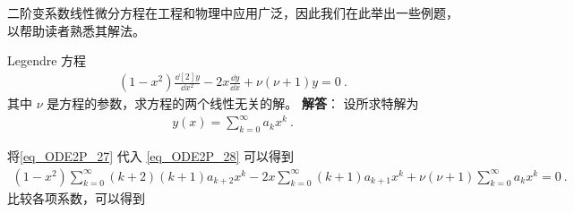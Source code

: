 二阶变系数线性微分方程在工程和物理中应用广泛，因此我们在此举出一些例题，以帮助读者熟悉其解法。

\begin{example}{Legendre 方程}
\begin{equation}\label{eq_ODE2P_28}
\begin{aligned}
    (1-x^2)\frac{\dd[2]{y}}{\dd x^2}-2x\frac{\dd y}{\dd x}+\nu(\nu+1)y=0~.
\end{aligned}
\end{equation}
其中 $\nu$ 是方程的参数，求方程的两个线性无关的解。
\textbf{解答}：
设所求特解为
\begin{equation}\label{eq_ODE2P_27}
\begin{aligned}
y(x) = \sum_{k=0}^\infty a_k x^k~.
\end{aligned}
\end{equation}

将\autoref{eq_ODE2P_27}  代入 \autoref{eq_ODE2P_28} 可以得到
\begin{equation}
\begin{aligned}
(1-x^2)\sum_{k=0}^{\infty}(k+2)(k+1)a_{k+2}x^k
-2x\sum_{k=0}^\infty (k+1)a_{k+1}x^k+\nu(\nu+1) \sum_{k=0}^\infty a_k x^k=0~.
\end{aligned}
\end{equation}
比较各项系数，可以得到
\begin{equation}
\begin{aligned}

\end{aligned}
\end{equation}

\end{example}


